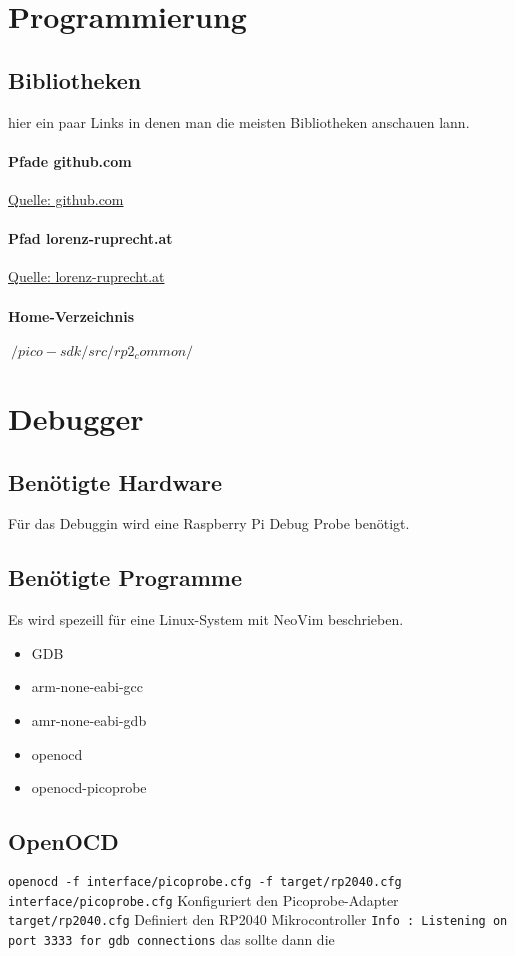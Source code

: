 \documentclass[a4paper,12pt,twoside]{article}
\begin{document}
\section{Programmierung}
\subsection{Bibliotheken}
hier ein paar Links in denen man die meisten Bibliotheken anschauen lann.
\paragraph{Pfade github.com}
\small \protect\href{https://github.com/raspberrypi/pico-sdk/tree/master/src/rp2_common}{Quelle: github.com}
\paragraph{Pfad lorenz-ruprecht.at}
\small \protect\href{https://lorenz-ruprecht.at/docu/pico-sdk/1.4.0/html/group__hardware.html}{Quelle: lorenz-ruprecht.at}
\paragraph{Home-Verzeichnis}
\small \texttt{$~/pico-sdk/src/rp2_common/$}
\section{Debugger}
\subsection{Benötigte Hardware}
Für das Debuggin wird eine Raspberry Pi Debug Probe benötigt.
\subsection{Benötigte Programme}
Es wird spezeill für eine Linux-System mit NeoVim beschrieben.
\begin{itemize}
	\item GDB
	\item arm-none-eabi-gcc
	\item amr-none-eabi-gdb
	\item openocd
	\item openocd-picoprobe
\end{itemize}
\subsection{OpenOCD}
\verb|openocd -f interface/picoprobe.cfg -f target/rp2040.cfg|
\verb|interface/picoprobe.cfg| Konfiguriert den Picoprobe-Adapter
\verb|target/rp2040.cfg| Definiert den RP2040 Mikrocontroller
\verb|Info : Listening on port 3333 for gdb connections| das sollte dann die
\end{document}
